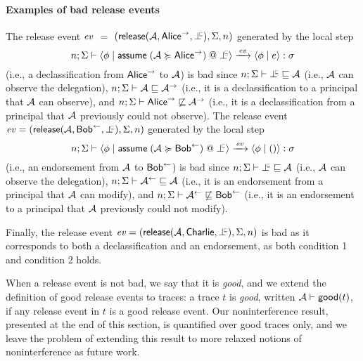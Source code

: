 \paragraph{Examples of bad release events}
The release event $\mathit{ev}$ $=$ $(\releaseevent{\Attacker}{\conf{\mathsf{Alice}}}{\botinfoflow}, \env, n)$ generated by the local step
\begin{equation*}
\step{n; \env}[][\event]{\config{\store}{\adddelegate{\Attacker}{\conf{\mathsf{Alice}}}{\botinfoflow}}}{\config{\store}{\expr}}{\sigma}
\end{equation*}
(i.e., a declassification from $\mathsf{Alice}^{\rightarrow}$ to $\mathcal{A}$) is bad since $\nopostflowstoquery{n; \env}{\botinfoflow}{\Attacker}$ (i.e., $\mathcal{A}$ can observe the delegation), $n; \Sigma \vdash \mathcal{A} \sqsubseteq \mathcal{A}^{\rightarrow}$ (i.e., it is a declassification to a principal that $\mathcal{A}$ can observe), and $n; \Sigma \vdash \mathsf{Alice}^{\rightarrow} \not\sqsubseteq \mathcal{A}^{\rightarrow}$ (i.e., it is a declassification from a principal that $\mathcal{A}$ previously could not observe). The release event $\event = (\releaseevent{\Attacker}{\integ{\mathsf{Bob}}}{\botinfoflow}, \env, n)$ generated by the local step
\begin{equation*}
\step{n; \env}[][\event]{\config{\store}{\adddelegate{\Attacker}{\integ{\mathsf{Bob}}}{\botinfoflow}}}{\config{\store}{()}}{\sigma}
\end{equation*}
(i.e., an endorsement from $\mathcal{A}$ to $\mathsf{Bob}^{\leftarrow}$) is bad since $\nopostflowstoquery{n; \env}{\botinfoflow}{\Attacker}$ (i.e., $\mathcal{A}$ can observe the delegation), $n; \Sigma \vdash \mathcal{A}^{\leftarrow} \sqsubseteq \mathcal{A}$ (i.e., it is an endorsement from a principal that $\mathcal{A}$ can modify), and $n; \Sigma \vdash \mathcal{A}^{\leftarrow} \not\sqsubseteq \mathsf{Bob}^{\leftarrow}$ (i.e., it is an endorsement to a principal that $\mathcal{A}$ previously could not modify).

Finally, the release event $\event = (\releaseevent{\Attacker}{\mathsf{Charlie}}{\botinfoflow}, \env, n)$ is bad as it corresponds to both a declassification and an endorsement, as both condition 1 and condition 2 holds.

When a release event is not bad, we say that it is \emph{good}, and we extend the definition of good release events to traces: a trace $t$ is \emph{good}, written $\mathcal{A} \vdash \mathsf{good}(t)$, if any release event in $t$ is a good release event. Our noninterference result, presented at the end of this section, is quantified over good traces only, and we leave the problem of extending this result to more relaxed notions of noninterference as future work.

